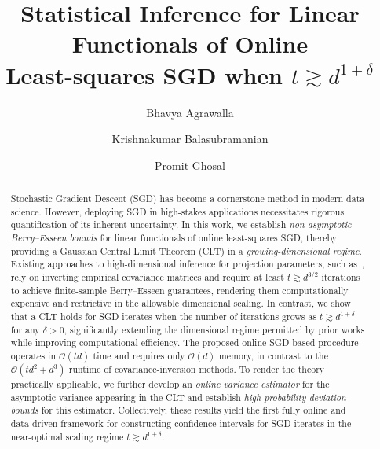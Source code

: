 \documentclass[11pt, reqno,english]{amsart}
\title[Growing-Dimensional SGD Inference for Least-squares]{Statistical Inference for Linear Functionals of Online \\ Least-squares SGD when $t \gtrsim d^{1+\delta}$}
\date{}
\author{Bhavya Agrawalla}
\author{Krishnakumar Balasubramanian}
\author{Promit Ghosal}
\begin{document}
\maketitle

\begin{abstract}
Stochastic Gradient Descent (SGD) has become a cornerstone method in modern data science. However, deploying SGD in high-stakes applications necessitates rigorous quantification of its inherent uncertainty. In this work, we establish \emph{non-asymptotic Berry--Esseen bounds} for linear functionals of online least-squares SGD, thereby providing a Gaussian Central Limit Theorem (CLT) in a \emph{growing-dimensional regime}. Existing approaches to high-dimensional inference for projection parameters, such as~\cite{chang2023inference}, rely on inverting empirical covariance matrices and require at least $t \gtrsim d^{3/2}$ iterations to achieve finite-sample Berry--Esseen guarantees, rendering them computationally expensive and restrictive in the allowable dimensional scaling. In contrast, we show that a CLT holds for SGD iterates when the number of iterations grows as $t \gtrsim d^{1+\delta}$ for any $\delta > 0$, significantly extending the dimensional regime permitted by prior works while improving computational efficiency. The proposed online SGD-based procedure operates in $\mathcal{O}(td)$ time and requires only $\mathcal{O}(d)$ memory, in contrast to the $\mathcal{O}(td^2 + d^3)$ runtime of covariance-inversion methods. To render the theory practically applicable, we further develop an \emph{online variance estimator} for the asymptotic variance appearing in the CLT and establish \emph{high-probability deviation bounds} for this estimator. Collectively, these results yield the first fully online and data-driven framework for constructing confidence intervals for SGD iterates in the near-optimal scaling regime $t \gtrsim d^{1+\delta}$.


\end{abstract}
\end{document}
